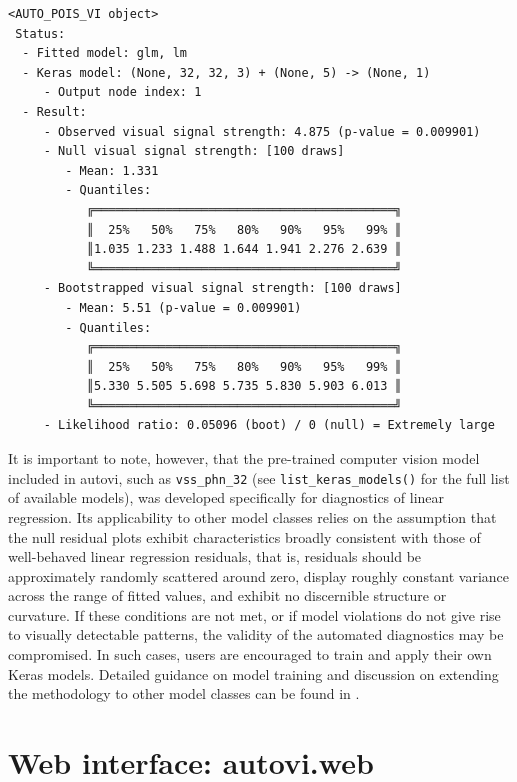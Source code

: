 \documentclass[
doublespace,
  times]{anzsauth}
\newenvironment{Shaded}{\begin{snugshade}}{\end{snugshade}}
\newcommand{\FunctionTok}[1]{\textcolor[rgb]{0.28,0.35,0.67}{#1}}
\newcommand{\NormalTok}[1]{\textcolor[rgb]{0.00,0.23,0.31}{#1}}
\newcommand{\SpecialCharTok}[1]{\textcolor[rgb]{0.37,0.37,0.37}{#1}}
\begin{document}
\begin{Shaded}
\end{Shaded}

\begin{verbatim}
<AUTO_POIS_VI object>
 Status:
  - Fitted model: glm, lm
  - Keras model: (None, 32, 32, 3) + (None, 5) -> (None, 1)
     - Output node index: 1
  - Result:
     - Observed visual signal strength: 4.875 (p-value = 0.009901)
     - Null visual signal strength: [100 draws]
        - Mean: 1.331
        - Quantiles: 
           ╔══════════════════════════════════════════╗
           ║  25%   50%   75%   80%   90%   95%   99% ║
           ║1.035 1.233 1.488 1.644 1.941 2.276 2.639 ║
           ╚══════════════════════════════════════════╝
     - Bootstrapped visual signal strength: [100 draws]
        - Mean: 5.51 (p-value = 0.009901)
        - Quantiles: 
           ╔══════════════════════════════════════════╗
           ║  25%   50%   75%   80%   90%   95%   99% ║
           ║5.330 5.505 5.698 5.735 5.830 5.903 6.013 ║
           ╚══════════════════════════════════════════╝
     - Likelihood ratio: 0.05096 (boot) / 0 (null) = Extremely large
\end{verbatim}

It is important to note, however, that the pre-trained computer vision
model included in \textsf{autovi}, such as \texttt{vss\_phn\_32} (see
\texttt{list\_keras\_models()} for the full list of available models),
was developed specifically for diagnostics of linear regression. Its
applicability to other model classes relies on the assumption that the
null residual plots exhibit characteristics broadly consistent with
those of well-behaved linear regression residuals, that is, residuals
should be approximately randomly scattered around zero, display roughly
constant variance across the range of fitted values, and exhibit no
discernible structure or curvature. If these conditions are not met, or
if model violations do not give rise to visually detectable patterns,
the validity of the automated diagnostics may be compromised. In such
cases, users are encouraged to train and apply their own \textsf{Keras}
models. Detailed guidance on model training and discussion on extending
the methodology to other model classes can be found in
\citet{li2024automated}.

\section{\texorpdfstring{Web interface:
\textsf{autovi.web}}{Web interface: }}\label{sec-autovi-web}
\end{document}
